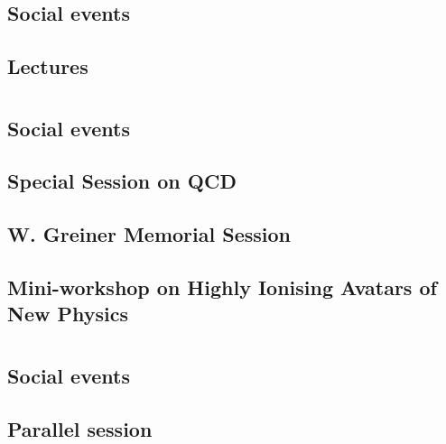 

\tableofcontents
\clearpage
\section{}
\subsection{Social events}

\clearpage

\subsection{Lectures}

\clearpage

\section{}
\subsection{Social events}

\clearpage

\subsection{Special Session on QCD}

\clearpage

\subsection{W. Greiner Memorial Session}

\clearpage

\subsection{Mini-workshop on Highly Ionising Avatars of New Physics}

\clearpage

\section{}
\subsection{Social events}

\clearpage

\subsection{Parallel session}

\clearpage

